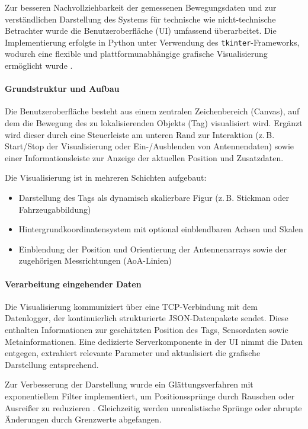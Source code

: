 \documentclass[a4paper, 12pt]{article} %
\begin{document}
Zur besseren Nachvollziehbarkeit der gemessenen Bewegungsdaten und zur verständlichen Darstellung des Systems für technische wie nicht-technische 
Betrachter wurde die Benutzeroberfläche (\ac{UI}) umfassend überarbeitet. Die Implementierung erfolgte in Python unter Verwendung des 
\texttt{tkinter}-Frameworks, wodurch eine flexible und plattformunabhängige grafische Visualisierung ermöglicht wurde \cite{tkinter_book}.

\paragraph{Grundstruktur und Aufbau}

Die Benutzeroberfläche besteht aus einem zentralen Zeichenbereich (Canvas), auf dem die Bewegung des zu lokalisierenden Objekts (Tag) visualisiert wird. 
Ergänzt wird dieser durch eine Steuerleiste am unteren Rand zur Interaktion (z.\,B. Start/Stop der Visualisierung oder Ein-/Ausblenden von Antennendaten) 
sowie einer Informationsleiste zur Anzeige der aktuellen Position und Zusatzdaten.

Die Visualisierung ist in mehreren Schichten aufgebaut:
\begin{itemize}
    \item Darstellung des Tags als dynamisch skalierbare Figur (z.\,B. Stickman oder Fahrzeugabbildung)
    \item Hintergrundkoordinatensystem mit optional einblendbaren Achsen und Skalen
    \item Einblendung der Position und Orientierung der Antennenarrays sowie der zugehörigen Messrichtungen (\ac{AoA}-Linien)
\end{itemize}

\paragraph{Verarbeitung eingehender Daten}

Die Visualisierung kommuniziert über eine \ac{TCP}-Verbindung mit dem Datenlogger, der kontinuierlich strukturierte \ac{JSON}-Datenpakete sendet. Diese enthalten 
Informationen zur geschätzten Position des Tags, Sensordaten sowie Metainformationen. Eine dedizierte Serverkomponente in der \ac{UI} nimmt die Daten entgegen,
extrahiert relevante Parameter und aktualisiert die grafische Darstellung entsprechend.

Zur Verbesserung der Darstellung wurde ein Glättungsverfahren mit exponentiellem Filter implementiert, um Positionssprünge durch Rauschen oder Ausreißer 
zu reduzieren \cite{signal_filtering}. Gleichzeitig werden unrealistische Sprünge oder abrupte Änderungen durch Grenzwerte abgefangen.
\end{document}
